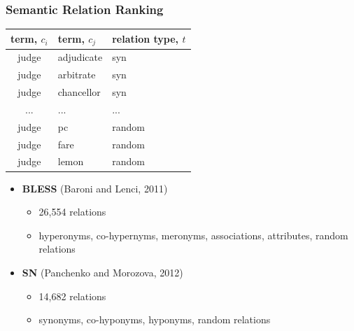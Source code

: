 \documentclass{beamer}
\begin{document}
\begin{frame}
\frametitle{Semantic Relation Ranking}

{ \scriptsize

\begin{table}[h]\footnotesize
\begin{tabular}{ |c|l|l| }
\hline
term, $c_i$ & term, $c_j$ & relation type, $t$  \\ \hline \hline
judge & adjudicate & syn \\
judge & arbitrate & syn \\
judge & chancellor & syn \\
... & ... & ...   \\
judge & pc & random \\ 
judge & fare & random \\
judge & lemon & random \\ \hline
\end{tabular}
\end {table}

}

\begin{itemize}
  \item \textbf{BLESS} (Baroni and Lenci, 2011)
  \begin{itemize}
    \item 26,554 relations
    \item hyperonyms, co-hypernyms, meronyms, associations, attributes, random relations
    \end{itemize}  
  \item \textbf{SN} (Panchenko and Morozova, 2012)
  \begin{itemize}
    \item 14,682  relations\
    \item synonyms, co-hyponyms, hyponyms, random relations
    \end{itemize}
    
     
\end{itemize}

\end{frame}
\end{document}
